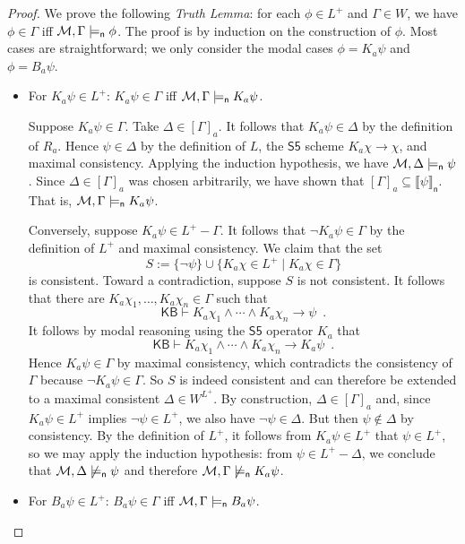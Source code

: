 \documentclass[12pt]{article}
\theoremstyle{definition}
\newcommand{\M}{{\cal M}}      %
\newcommand{\KB}{{\mathsf{KB}}}                        %
\newcommand{\modelsn}{\models_{\mathsf{n}}}                  %
\newcommand{\semn}[1]{\llbracket{#1}\rrbracket_{\mathsf{n}}} %
\begin{document}
\begin{proof}
  We prove the
  following \emph{Truth Lemma\/}: for each $\phi\in L^+$ and
  $\Gamma\in W$, we have $\phi\in\Gamma$ iff
  $\M,\Gamma\modelsn\phi$. The proof is by induction on the
  construction of $\phi$.  Most cases are straightforward; we only
  consider the modal cases $\phi=K_a\psi$ and $\phi=B_a\psi$.
  \begin{itemize}
  \item For $K_a\psi\in L^+$: $K_a\psi\in\Gamma$ iff
    $\M,\Gamma\modelsn K_a\psi$.

    Suppose $K_a\psi\in\Gamma$. Take $\Delta\in[\Gamma]_a$.
    It follows that $K_a\psi\in\Delta$ by the definition of
    $R_a$.  Hence $\psi\in\Delta$ by the definition of $L$,
    the $\mathsf{S5}$ scheme $K_a\chi\to\chi$, and maximal consistency.
    Applying the induction hypothesis, we have
    $\M,\Delta\modelsn\psi$.  Since $\Delta\in[\Gamma]_a$ was
    chosen arbitrarily, we have shown that 
    $[\Gamma]_a\subseteq\semn{\psi}$.  That is,
    $\M,\Gamma\modelsn
    K_a\psi$.

    Conversely, suppose $K_a\psi\in L^+-\Gamma$.  It follows that $\lnot
    K_a\psi\in\Gamma$ by the definition of $L^+$ and maximal
    consistency.  We claim that the set
    \[
    S:=\{\lnot\psi\}\cup\{K_a\chi\in L^+\mid K_a\chi\in\Gamma\}
    \]
    is consistent.  Toward a contradiction, suppose $S$ is not
    consistent.  It follows that there are
    $K_a\chi_1,\ldots,K_a\chi_n\in\Gamma$ such that
    \[
    \KB\vdash K_a\chi_1\land\cdots\land K_a\chi_n\to \psi\enspace.
    \]
    It follows by modal reasoning using the $\mathsf{S5}$ operator
    $K_a$ that
    \[
    \KB\vdash K_a\chi_1\land\cdots\land K_a\chi_n\to K_a\psi\enspace.
    \]
    Hence $K_a\psi\in\Gamma$ by maximal consistency, which contradicts
    the consistency of $\Gamma$ because $\lnot K_a\psi\in\Gamma$.  
    So $S$ is indeed consistent and can therefore be
    extended to a maximal consistent $\Delta\in W^{L^+}$.  By construction,
    $\Delta\in[\Gamma]_a$ and, since $K_a\psi\in L^+$ implies $\lnot\psi\in L^+$,
    we also have $\lnot\psi\in\Delta$. But then
    $\psi\notin\Delta$ by consistency. By the definition
    of $L^+$, it follows from $K_a\psi\in L^+$ that $\psi\in L^+$, so we may
    apply the induction hypothesis: from $\psi\in L^+-\Delta$, we
    conclude that $\M,\Delta\not\modelsn\psi$ and therefore
    $\M,\Gamma\not\modelsn K_a\psi$.
    
  \item For $B_a\psi\in L^+$: $B_a\psi\in\Gamma$ iff
    $\M,\Gamma\modelsn B_a\psi$.


\end{itemize}
\end{proof}
\end{document}

